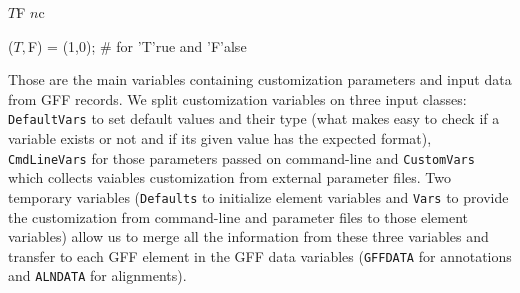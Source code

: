 \documentclass[11pt]{article}
\def\nwendcode{\endtrivlist \endgroup} %
\let\nwdocspar=\par                    %
\begin{document}
\nwenddocs{}\endmoddef
$T $F $n $c %
\nwendcode{}\nwdocspar

\nwenddocs{}\endmoddef
($T,$F) = (1,0); # for 'T'rue and 'F'alse
\nwendcode{}\nwdocspar

Those are the main variables containing customization parameters and input data from GFF records. We split customization variables on three input classes: {\tt{}{}DefaultVars} to set default values and their type (what makes easy to check if a variable exists or not and if its given value has the expected format), {\tt{}{}CmdLineVars} for those parameters passed on command-line and {\tt{}{}CustomVars} which collects vaiables customization from external parameter files. Two temporary variables ({\tt{}{}Defaults} to initialize element variables and {\tt{}{}Vars} to provide the customization from command-line and parameter files to those element variables) allow us to merge all the information from these three variables and transfer to each GFF element in the GFF data variables ({\tt{}{}GFF{}DATA} for annotations and {\tt{}{}ALN{}DATA} for alignments).
\end{document}
